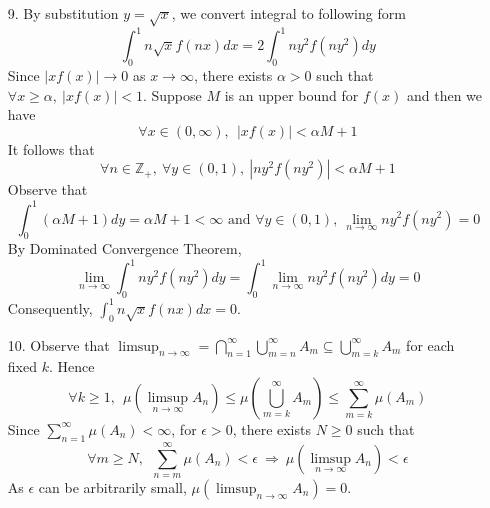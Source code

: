 \begin{itemize}
	\item[9.] By substitution $y= \sqrt{x}$, we convert integral to following form
	$$
	\int_{0}^1 n\sqrt{x}f(nx)dx = 2\int_{0}^1 ny^2f(ny^2)dy
	$$ 
	Since $\lvert xf(x)\rvert \rightarrow 0$ as $x\rightarrow \infty$, there exists $\alpha >0$ such that $\forall x\ge \alpha,~\lvert xf(x)\rvert<1$. Suppose $M$ is an upper bound for $f(x)$ and then we have
	\[
	\forall x\in (0,\infty),~~|xf(x)| < \alpha M+1
	\] 
	It follows that
	\[
	\forall n\in\mathbb{Z}_+,~\forall y\in (0,1),~\left\lvert ny^2f(ny^2)\right\rvert < \alpha M+1
	\]
	Observe that $$\int_{0}^1(\alpha M+1)dy = \alpha M+1 < \infty \text{ and }\forall y\in (0,1),~\lim_{n\rightarrow\infty}ny^2f(ny^2) = 0$$ By Dominated Convergence Theorem, 
	\[
	\lim_{n\rightarrow\infty}\int_{0}^1 ny^2f(ny^2)dy = \int_{0}^1 \lim_{n\rightarrow\infty}ny^2f(ny^2)dy = 0
	\]
	Consequently, $\int_{0}^1n\sqrt{x}f(nx)dx = 0$.
	\item[10.] Observe that $\limsup_{n\rightarrow \infty} = \bigcap_{n=1}^\infty \bigcup_{m=n}^\infty A_m \subseteq \bigcup_{m=k}^\infty A_m$ for each fixed $k$.
	Hence
	$$
	\forall k\ge 1,~~\mu\left(\limsup_{n\rightarrow \infty}A_n\right)\le \mu\left(\bigcup_{m=k}^\infty A_m\right) \le \sum_{m=k}^\infty \mu\left(A_m\right)
	$$
	Since $\sum_{n=1}^\infty \mu\left(A_n\right) < \infty$, for $\epsilon >0$, there exists $N\ge 0$ such that
	$$
	\forall m\ge N,~~\sum_{n=m}^\infty \mu\left(A_n\right) < \epsilon ~\Rightarrow~ \mu\left(\limsup_{n\rightarrow \infty}A_n\right)<\epsilon
	$$
	As $\epsilon$ can be arbitrarily small, $\mu\left(\limsup_{n\rightarrow \infty}A_n\right) = 0$.
\end{itemize}
